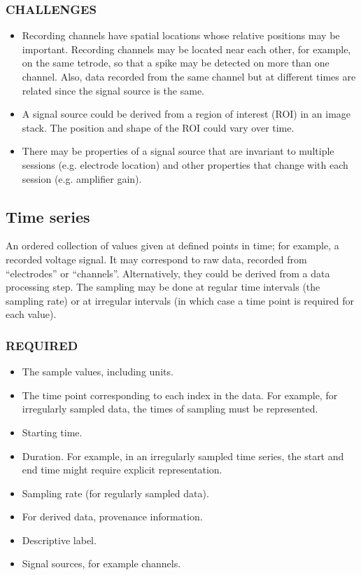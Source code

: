 \documentclass[letterpaper, 10 pt, conference]{ieeeconf}  \IEEEoverridecommandlockouts                              \overrideIEEEmargins
\begin{document}
\subsubsection*{CHALLENGES}
\begin{itemize}
\item Recording channels have spatial locations whose relative positions may be important.  Recording channels may be located near each other, for example, on the same tetrode, so that a spike may be detected on more than one channel.  Also, data recorded from the same channel but at different times are related since the signal source is the same.
\item A signal source could be derived from a region of interest (ROI) in an image stack.  The position and shape of the ROI could vary over time.
\item There may be properties of a signal source that are invariant to multiple sessions (e.g. electrode location) and other properties that change with each session (e.g. amplifier gain).
\end{itemize}

\subsection{Time series}
An ordered collection of values given at defined points in time; for example, a recorded voltage  signal. It may correspond to raw data, recorded from “electrodes” or “channels”.   Alternatively, they could be derived from a data processing step.  The sampling may be done at regular time intervals (the sampling rate) or at irregular intervals (in which case a time point is required for each value).
\smallskip
\smallskip
\subsubsection*{REQUIRED}
\begin{itemize}
\item The sample values, including units.  
\item The time point corresponding to each index in the data.  For example, for irregularly sampled data, the times of sampling must be represented. 
\item Starting time. 
\item Duration.  For example, in an irregularly sampled time series, the start and end time might require explicit representation.  
\item Sampling rate (for regularly sampled data).
\item For derived data, provenance information.  
\item Descriptive label.
\item Signal sources, for example channels. 
\end{itemize}
\smallskip
\end{document}
